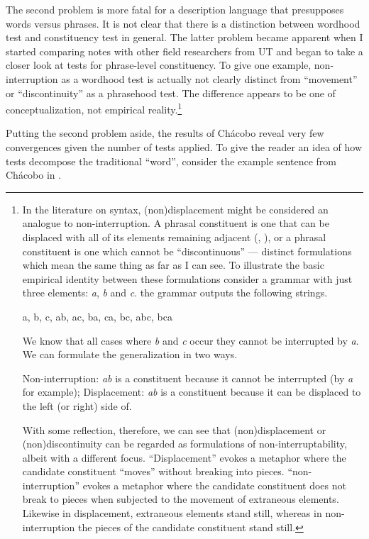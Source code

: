 \documentclass[output=paper,hidelinks]{langscibook}
\begin{document}
The second problem is more fatal for a description language that presupposes words versus phrases. It is not clear that there is a distinction between wordhood test and constituency test in general. The latter problem became apparent when I started comparing notes with other field researchers from UT and began to take a closer look at tests for phrase-level constituency. To give one example, non-interruption as a wordhood test is actually not clearly distinct from ``movement'' or ``discontinuity'' as a phrasehood test. The difference appears to be one of conceptualization, not empirical reality.\footnote{In the literature on syntax, (non)displacement might be considered an analogue to non-interruption. A phrasal constituent is one that can be displaced with all of its elements remaining adjacent (\cite[25]{kroeger2005analyzing}, \cite[8]{levine2017syntactic}), or a phrasal constituent is one which cannot be ``discontinuous'' \citep[114]{louagie2021nouna} — distinct formulations which mean the same thing as far as I can see. To illustrate the basic empirical identity between these formulations consider a grammar with just three elements: \textit{a}, \textit{b} and \textit{c}. the grammar outputs the following strings.

\ea \label{toygrammar1}
    a, b, c, ab, ac, ba, ca, bc, abc, bca   
\z 

We know that all cases where \textit{b} and \textit{c} occur they cannot be interrupted by \textit{a}. We can formulate the generalization in two ways.

\ea \label{non-interruptionvsdisplacement}
    \ea Non-interruption: \textit{ab} is a constituent because it cannot be interrupted (by \textit{a} for example);
    \ex Displacement: \textit{ab} is a constituent because it can be displaced to the left (or right) side of.
    \z
\z 

With some reflection, therefore, we can see that (non)displacement or (non)discontinuity can be regarded as formulations of non-interruptability, albeit with a different focus. ``Displacement'' evokes a metaphor where the candidate constituent  ``moves'' without breaking into pieces.  ``non-interruption'' evokes a metaphor where the candidate constituent does not break to pieces when subjected to the movement of extraneous elements. Likewise in displacement, extraneous elements stand still, whereas in non-interruption the pieces of the candidate constituent stand still.}

Putting the second problem aside, the results of Chácobo reveal very few convergences given the number of tests applied. To give the reader an idea of how tests decompose the traditional ``word'', consider the example sentence from Chácobo in .
\end{document}
